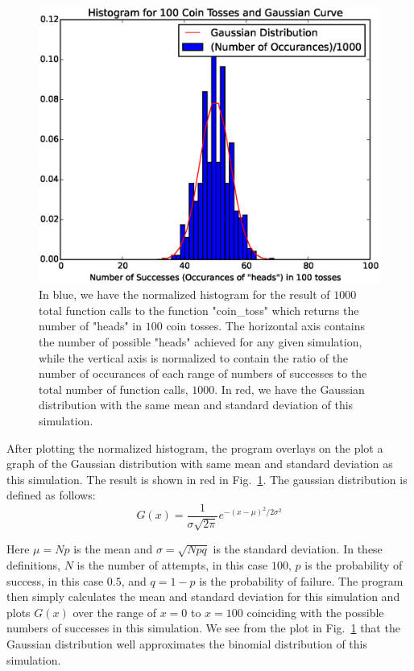 \documentclass[12pt]{article}
\begin{document}
\begin{figure}[h]
\begin{center}
\includegraphics[width=300bp]{p4_hw6_histgauss.eps}
\vspace{-18bp}
\end{center}
\caption[]{\label{fig:hist}\small
In blue, we have the normalized histogram for the result of $1000$ total
function calls to the function "coin\_toss" which returns the number of "heads"
in $100$ coin tosses. The horizontal axis contains the number of possible
"heads" achieved for any given simulation, while the vertical axis is normalized
to contain the ratio of the number of occurances of each range of numbers of
successes to the total number of function calls, $1000$. In red, we have the
Gaussian distribution with the same mean and standard deviation of this simulation.
}
\end{figure}

After plotting the normalized histogram, the program overlays on the plot a
graph of the Gaussian distribution with same mean and standard deviation as
this simulation. The result is shown in red in Fig.~\ref{fig:hist}.
The gaussian distribution is defined as follows:
\begin{equation} \label{eq:1}
G(x) = \frac{1}{\sigma\sqrt{2\pi}}e^{-(x-\mu)^2/2\sigma^2}
\end{equation}

Here $\mu=Np$ is the mean and $\sigma=\sqrt{Npq}$ is the standard deviation.
In these definitions, $N$ is the number of attempts, in this case $100$, $p$ is the probability of success, in this case $0.5$, and $q=1-p$ is the probability
of failure. The program then simply calculates the mean and standard deviation
for this simulation and plots $G(x)$ over the range of $x=0$ to $x=100$
coinciding with the possible numbers of successes in this simulation. We see
from the plot in Fig.~\ref{fig:hist} that the Gaussian distribution well
approximates the binomial distribution of this simulation.
\end{document}

